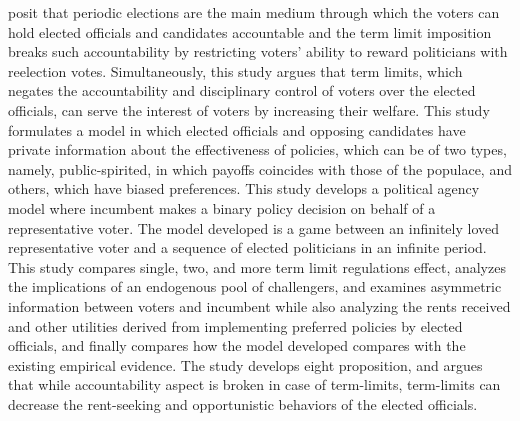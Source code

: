  posit that periodic elections are the main medium through which the voters can hold elected officials and candidates accountable and the term limit imposition breaks such accountability by restricting voters' ability to reward politicians with reelection votes. Simultaneously, this study argues that term limits, which negates the accountability and disciplinary control of voters over the elected officials, can serve the interest of voters by increasing their welfare. This study formulates a model in which elected officials and opposing candidates have private information about the effectiveness of policies, which can be of two types, namely, public-spirited, in which payoffs coincides with those of the populace, and others, which have biased preferences. This study develops a political agency model where incumbent makes a binary policy decision on behalf of a representative voter. The model developed is a game between an infinitely loved representative voter and a sequence of elected politicians in an infinite period. This study compares single, two, and more term limit regulations effect, analyzes the implications of an endogenous pool of challengers, and examines asymmetric information between voters and incumbent while also analyzing the rents received and other utilities derived from implementing preferred policies by elected officials, and finally compares how the model developed compares with the existing empirical evidence. The study develops eight proposition, and argues that while accountability aspect is broken in case of term-limits, term-limits can decrease the rent-seeking and opportunistic behaviors of the elected officials.\\
